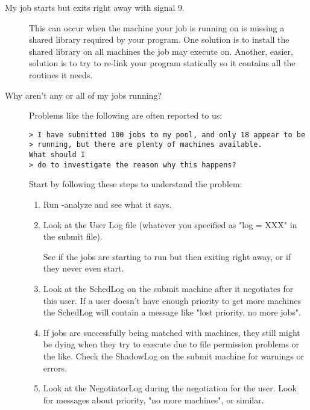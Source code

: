\begin{description}
\begin {enumerate}
\end{enumerate}

\item[My job starts but exits right away with signal 9.]


This can occur when the machine your job is running on is missing a
shared library required by your program.
One solution is to install the shared library on all machines the job
may execute on.
Another, easier, solution is to try to re-link your program statically
so it contains all the routines it needs.


\item[Why aren't any or all of my jobs running?]

Problems like the following are often reported to us:

\begin{verbatim}
> I have submitted 100 jobs to my pool, and only 18 appear to be
> running, but there are plenty of machines available.
What should I
> do to investigate the reason why this happens?
\end{verbatim}

Start by following these steps to understand the problem:

\begin{enumerate}

\item Run  -analyze and see what it says.

\item Look at the User Log file (whatever you specified as "log = XXX"
in the submit file).

See if the jobs are starting to run but then exiting right away, or if
they never even start.

\item Look at the SchedLog on the submit machine after it negotiates
for this user.
If a user doesn't have enough priority to get more machines the
SchedLog will contain a message like "lost priority, no more jobs".

\item If jobs are successfully being matched with machines, they
still might be dying when they try to execute due to file permission
problems or the like.
Check the ShadowLog on the submit machine for warnings or errors.

\item Look at the NegotiatorLog during the negotiation for the user.
Look for messages about priority, "no more machines", or similar.


\end{enumerate}
\end{description}
